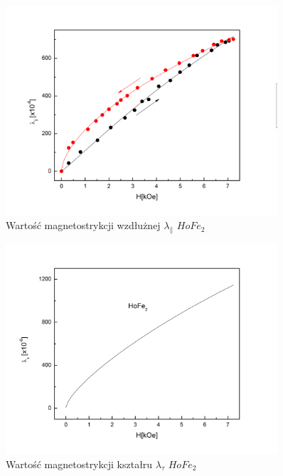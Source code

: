 \documentclass[a4paper,12pt]{article}
\numberwithin{equation}{section}
\begin{document}
\begin{figure}[h]
    \centering
    \includegraphics[width =0.9\textwidth]{../img/magneto/Howzdluzna}
    \caption{Wartość magnetostrykcji wzdłużnej $\lambda_{\parallel}$ $HoFe_2$}
    \label{Howzdluzna}
\end{figure}

\begin{figure}[h]
    \centering
    \includegraphics[width =0.9\textwidth]{../img/magneto/HoKsztaltu}
    \caption{Wartość magnetostrykcji kształru $\lambda_{\tau}$ $HoFe_2$}
    \label{HoKsztaltu}
\end{figure}
\end{document}
